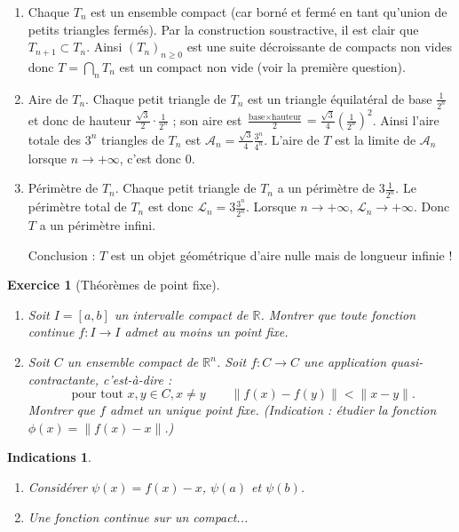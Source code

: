\documentclass[11pt,a4paper]{article}
\newcommand{\Rr}{\mathbb{R}} \newcommand{\R}{\mathbb{R}}
\renewcommand{\ge}{\geqslant} \renewcommand{\geq}{\geqslant}
\theoremstyle{exostyle}
\newtheorem{exo}{Exercice}
\newtheorem{ind}{Indications}
\newcommand{\exercice}[1]{} \newcommand{\finexercice}{}
\newcommand{\enonce}{\begin{exo}} \newcommand{\finenonce}{\end{exo}}
\newcommand{\indication}{\begin{ind}} \newcommand{\finindication}{\end{ind}}
\newcommand{\sauteligne}{\leavevmode\vspace{-\baselineskip}}
\begin{document}
\begin{enumerate}
\begin{enumerate}
	\item Chaque $T_n$ est un ensemble compact (car borné et fermé en tant qu'union de petits triangles fermés). Par la construction soustractive, il est clair que $T_{n+1} \subset T_n$. Ainsi
	$(T_n)_{n\ge0}$ est une suite décroissante de compacts non vides donc $T = \bigcap_n T_n$ est un compact non vide (voir la première question).

	\item Aire de $T_n$. Chaque petit triangle de $T_n$ est un triangle équilatéral de base $\frac{1}{2^n}$ et donc de hauteur $\frac{\sqrt3}{2} \cdot \frac{1}{2^n}$ ; son aire est  $\frac{\text{base}\times\text{hauteur}}{2} = \frac{\sqrt{3}}{4} \left(\frac{1}{2^n}\right)^2$.
	Ainsi l'aire totale des $3^n$ triangles de $T_n$ est $\mathcal{A}_n =  \frac{\sqrt{3}}{4} \frac{3^n}{4^n}$.
	L'aire de $T$ est la limite de $\mathcal{A}_n$ lorsque $n\to+\infty$, c'est donc $0$.
	
	
	\item Périmètre de $T_n$. 
	Chaque petit triangle de $T_n$ a un périmètre de $3 \frac{1}{2^n}$. 
	Le périmètre total de $T_n$ est donc $\mathcal{L}_n = 3  \frac{3^n}{2^n}$.
	Lorsque $n \to +\infty$, $\mathcal{L}_n \to +\infty$. Donc $T$ a un périmètre infini.
	
	Conclusion : $T$ est un objet géométrique d'aire nulle mais de longueur infinie !
\end{enumerate}	
\end{enumerate}	
\fincorrection

\finexercice


\exercice{}
\enonce[Théorèmes de point fixe]
\sauteligne
\begin{enumerate}
	\item Soit $I=[a,b]$ un intervalle compact de $\Rr$.
	Montrer que toute fonction continue $f : I \to I$ admet au moins un point fixe.
	
	\item Soit $C$ un ensemble compact de $\Rr^n$. Soit $f : C \to C$ une application \emph{quasi-contractante}, c'est-à-dire :
	$$\text{ pour tout } x, y \in C, x \neq y \qquad
	\| f (x) - f (y) \| < \|x - y\|.$$
	Montrer que $f$ admet un unique point fixe.
	(Indication : étudier la fonction $\phi(x) = \|f (x) - x \|$.)

\end{enumerate}
\finenonce

\indication
\begin{enumerate}
	\item Considérer $\psi(x) = f(x)-x$, $\psi(a)$ et $\psi(b)$.
	
	\item Une fonction continue sur un compact...
\end{enumerate}
\finindication
\end{document}
